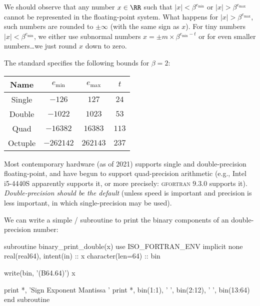 \begin{ddanger}
  We should observe that any number $x\in\RR$ such that $|x|<\beta^{e_{\text{min}}}$
  or $|x|>\beta^{e_{\text{max}}}$ cannot be represented in
  the floating-point system. What happens for
  $|x|>\beta^{e_{\text{max}}}$, such numbers are rounded to $\pm\infty$
  (with the same sign as $x$). For tiny numbers $|x|<\beta^{e_{\text{min}}}$,
  we either use subnormal numbers $x=\pm m\times\beta^{e_{\text{min}}-t}$
  or for even smaller numbers\dots we just round $x$ down to zero.
\end{ddanger}


\begin{rmk}
  The  standard specifies the following bounds for $\beta=2$:
  \begin{center}
    \bgroup
    \def\arraystretch{1.125}
    \begin{tabular}{|c|c|c|c|}
      Name   & $e_{\text{min}}$ & $e_{\text{max}}$ & $t$ \\\hline
      Single & $-126$         & $127$          & $24$\\
      Double & $-1022$        & $1023$         & $53$\\
      Quad   & $-16382$       & $16383$        & $113$\\
      Octuple & $-262142$     & $262143$       & $237$
    \end{tabular}
    \egroup
  \end{center}
  Most contemporary hardware (as of 2021) supports single and
  double-precision floating-point, and have begun to support
  quad-precision arithmetic (e.g., Intel i5-4440S apparently supports
  it, or more precisely: \textsc{gfortran} $9.3.0$ supports
  it). \emph{Double-precision should be the default} (unless speed is important
  and precision is less important, in which single-precision may be used).
\end{rmk}

\begin{chunk}
  We can write a simple \FORTRAN/ subroutine to print the binary
  components of an  double-precision
  number:
  \begin{fortran}
  subroutine binary_print_double(x)
    use ISO_FORTRAN_ENV
    implicit none
    real(real64), intent(in) :: x
    character(len=64) :: bin
    
    write(bin, '(B64.64)') x
    
    print *, 'Sign Exponent     Mantissa '
    print *, bin(1:1), '    ', bin(2:12), '  ', bin(13:64)
  end subroutine
  \end{fortran}
\end{chunk}


